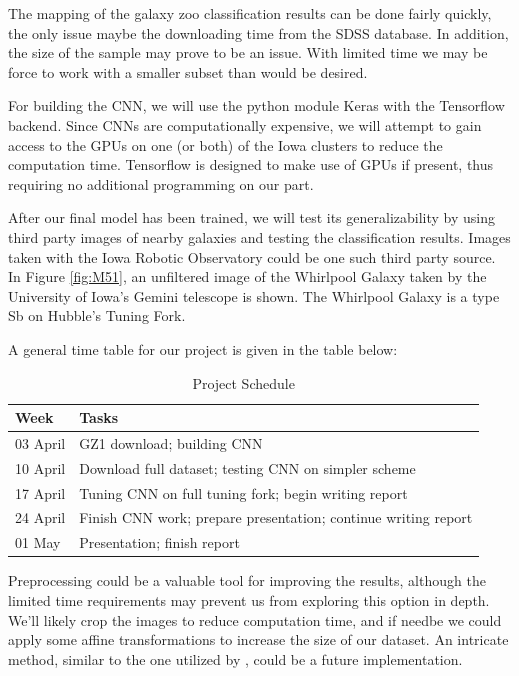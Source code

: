 \documentclass{article}
\begin{document}
The mapping of the galaxy zoo classification results can be done fairly quickly, the only issue maybe the downloading time from the SDSS database. In addition, the size of the sample may prove to be an issue. With limited time we may be force to work with a smaller subset than would be desired. 

For building the CNN, we will use the python module Keras with the Tensorflow backend. Since CNNs are computationally expensive, we will attempt to gain access to the GPUs on one (or both) of the Iowa clusters to reduce the computation time. Tensorflow is designed to make use of GPUs if present, thus requiring no additional programming on our part.

After our final model has been trained, we will test its generalizability by using third party images of nearby galaxies and testing the classification results. Images taken with the Iowa Robotic Observatory could be one such third party source. In Figure \ref{fig:M51}, an unfiltered image of the Whirlpool Galaxy taken by the University of Iowa's Gemini telescope is shown. The Whirlpool Galaxy is a type Sb on Hubble's Tuning Fork. 

A general time table for our project is given in the table below:

\begin{table}[!h]
  \caption{Project Schedule}
  \label{tab:plan}
  \centering
  \begin{tabular}{ll}
    \toprule
    \cmidrule{1-2}
    Week     & Tasks \\
    \midrule
    03 April 	& GZ1 download; building CNN    \\
    10 April    & Download full dataset; testing CNN on simpler scheme \\
    17 April    & Tuning CNN on full tuning fork; begin writing report       \\
	24 April	& Finish CNN work; prepare presentation; continue writing report  \\
	01 May		& Presentation; finish report \\
    \bottomrule
  \end{tabular}
\end{table}


Preprocessing could be a valuable tool for improving the results, although the limited time requirements may prevent us from exploring this option in depth. We'll likely crop the images to reduce computation time, and if needbe we could apply some affine transformations to increase the size of our dataset. An intricate method, similar to the one utilized by \cite{2015MNRAS.450.1441D}, could be a future implementation.
\end{document}
